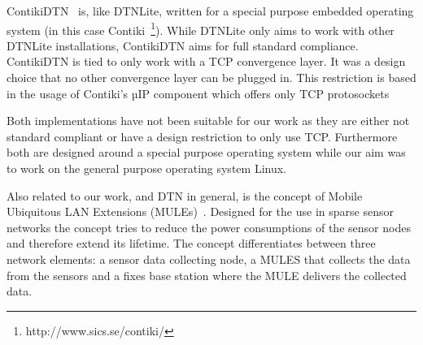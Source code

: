 ContikiDTN~\cite{contikidtn} is, like DTNLite, written for a special purpose
embedded operating system (in this case Contiki~\footnote{http://www.sics.se/contiki/}). While DTNLite only aims to work with
other DTNLite installations, ContikiDTN aims for full standard compliance.
ContikiDTN is tied to only work with a TCP convergence layer. It was a design
choice that no other convergence layer can be plugged in. This restriction is based in
the usage of Contiki's µIP component which offers only TCP protosockets

Both implementations have not been suitable for our work as they are either not
standard compliant or have a design restriction to only use TCP. Furthermore both
are designed around a special purpose operating system while our aim was to work
on the general purpose operating system Linux.

Also related to our work, and DTN in general, is the concept of Mobile
Ubiquitous LAN Extensions (MULEs)~\cite{mule}. Designed for the use in sparse
sensor networks the concept tries to reduce the power consumptions of the sensor
nodes and therefore extend its lifetime. The concept differentiates between
three network elements: a sensor data collecting node, a MULES that collects the
data from the sensors and a fixes base station where the MULE delivers the
collected data.
